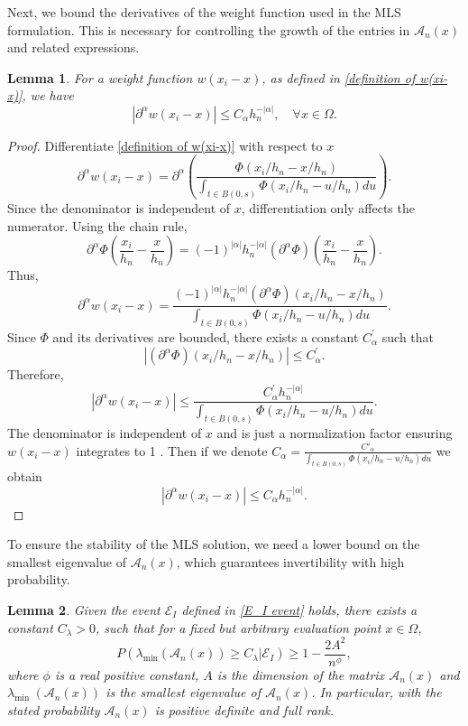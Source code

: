 \documentclass{article}
\newtheorem{lemma}{Lemma}
\begin{document}
Next, we bound the derivatives of the weight function used in the MLS formulation. This is necessary for controlling the growth of the entries in $\mathscr{A}_n(x)$ and related expressions.

\begin{lemma}
For a weight function $w(x_i-x)$, as defined in \eqref{definition of w(xi-x)}, we have
    $$\left|\partial^\alpha w(x_i-x)\right| \leq C_\alpha h_n^{-|\alpha|}, \quad \forall x \in \Omega.$$
    \label{bound of weight fun}
\end{lemma}

\begin{proof}
Differentiate \eqref{definition of w(xi-x)} with respect to $x$ 
$$  
\partial^\alpha w(x_i-x)=\partial^\alpha\left(\frac{\Phi(x_i/h_n - x/h_n)}{\int_{t\in B(0, s)}\Phi(x_i/h_n - u/h_n) du}\right).
$$
Since the denominator is independent of $x$, differentiation only affects the numerator. Using the chain rule,
$$
\partial^\alpha \Phi\left(\frac{x_i}{h_n}-\frac{x}{h_n}\right)=(-1)^{|\alpha|} h_n^{-|\alpha|}\left(\partial^\alpha \Phi\right)\left(\frac{x_i}{h_n}- \frac{x}{h_n}\right).
$$
Thus,
$$
\partial^\alpha w(x_i-x)=\frac{(-1)^{|\alpha|} h_n^{-|\alpha|}\left(\partial^\alpha \Phi\right)(x_i/h_n - x/h_n)}{\int_{t\in B(0, s)}\Phi(x_i/h_n - u/h_n) du}.
$$
Since $\Phi$ and its derivatives are bounded, there exists a constant $C_\alpha^{\prime}$ such that
$$
\left|\left(\partial^\alpha \Phi\right)(x_i/h_n - x/h_n)\right| \leq C_\alpha^{\prime}.
$$
Therefore,
$$
\left|\partial^\alpha w(x_i-x)\right| \leq \frac{C_\alpha^{\prime} h_n^{-|\alpha|}}{\int_{t\in B(0, s)}\Phi(x_i/h_n - u/h_n) du}.
$$
The denominator is independent of $x$ and is just a normalization factor ensuring $w(x_i-x)$ integrates to 1 . Then if we denote $C_\alpha=\frac{C'_\alpha}{\int_{t\in B(0, s)}\Phi(x_i/h_n - u/h_n) du}$ we obtain
$$
\left|\partial^\alpha w(x_i-x)\right| \leq C_\alpha h_n^{-|\alpha|}.
$$

\end{proof}


To ensure the stability of the MLS solution, we need a lower bound on the smallest eigenvalue of $\mathscr{A}_n(x)$, which guarantees invertibility with high probability.

\begin{lemma} 
Given the event $\mathscr{E}_I$ defined in \eqref{E_I event} holds, there exists a constant $C_\lambda>0$,  such that for a fixed but arbitrary evaluation point $x\in \Omega$,
$$
P\left(\lambda_{\min }\left(\mathscr{A}_n(x)\right) \geq C_\lambda \Big| \mathscr{E}_I\right)\geq 1-\frac{2A^2}{n^\phi},
$$
where $\phi$ is a real positive constant, $A$ is the dimension of the matrix $\mathscr{A}_n(x)$ and $\lambda_{\text {min }}\left(\mathscr{A}_n(x)\right)$ is the smallest eigenvalue of $\mathscr{A}_n(x)$. In particular, with the stated probability $\mathscr{A}_n(x)$ is positive definite and full rank.
    \label{lemma 3.7 davoud - lambda_min}
\end{lemma}
\end{document}

